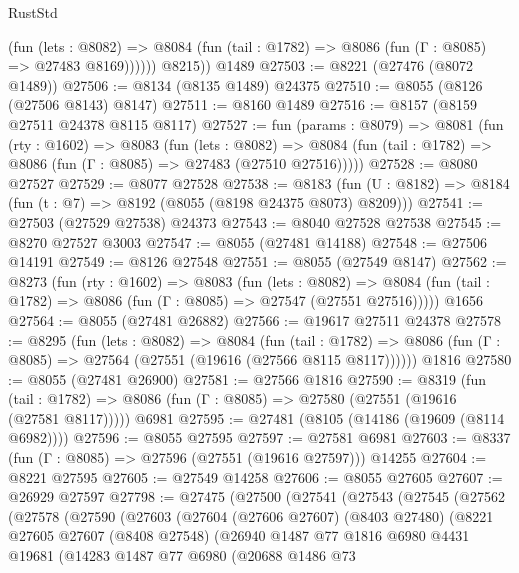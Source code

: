 \begin{lexlean}{RustStd}
\begin{coremodule}
              (fun (lets : @8082) =>
              @8084 (fun (tail : @1782) => @8086 (fun (Γ : @8085) => @27483 @8169))))))
        @8215))
    @1489
@27503 := @8221 (@27476 (@8072 @1489))
@27506 := @8134 (@8135 @1489) @24375
@27510 := @8055 (@8126 (@27506 @8143) @8147)
@27511 := @8160 @1489
@27516 := @8157 (@8159 @27511 @24378 @8115 @8117)
@27527 := fun (params : @8079) =>
  @8081
    (fun (rty : @1602) =>
    @8083
      (fun (lets : @8082) =>
      @8084 (fun (tail : @1782) => @8086 (fun (Γ : @8085) => @27483 (@27510 @27516)))))
@27528 := @8080 @27527
@27529 := @8077 @27528
@27538 := @8183
    (fun (U : @8182) => @8184 (fun (t : @7) => @8192 (@8055 (@8198 @24375 @8073) @8209)))
@27541 := @27503 (@27529 @27538) @24373
@27543 := @8040 @27528 @27538
@27545 := @8270 @27527 @3003
@27547 := @8055 (@27481 @14188)
@27548 := @27506 @14191
@27549 := @8126 @27548
@27551 := @8055 (@27549 @8147)
@27562 := @8273
    (fun (rty : @1602) =>
    @8083
      (fun (lets : @8082) =>
      @8084 (fun (tail : @1782) => @8086 (fun (Γ : @8085) => @27547 (@27551 @27516)))))
    @1656
@27564 := @8055 (@27481 @26882)
@27566 := @19617 @27511 @24378
@27578 := @8295
    (fun (lets : @8082) =>
    @8084
      (fun (tail : @1782) =>
      @8086 (fun (Γ : @8085) => @27564 (@27551 (@19616 (@27566 @8115 @8117))))))
    @1816
@27580 := @8055 (@27481 @26900)
@27581 := @27566 @1816
@27590 := @8319
    (fun (tail : @1782) => @8086 (fun (Γ : @8085) => @27580 (@27551 (@19616 (@27581 @8117)))))
    @6981
@27595 := @27481 (@8105 (@14186 (@19609 (@8114 @6982))))
@27596 := @8055 @27595
@27597 := @27581 @6981
@27603 := @8337 (fun (Γ : @8085) => @27596 (@27551 (@19616 @27597))) @14255
@27604 := @8221 @27595
@27605 := @27549 @14258
@27606 := @8055 @27605
@27607 := @26929 @27597
@27798 := @27475
    (@27500
      (@27541
        (@27543
          (@27545
            (@27562
              (@27578
                (@27590
                  (@27603
                    (@27604
                      (@27606 @27607)
                      (@8403 @27480)
                      (@8221
                        @27605
                        @27607
                        (@8408 @27548)
                        (@26940
                          @1487
                          @77
                          @1816
                          @6980
                          @4431
                          @19681
                          (@14283
                            @1487
                            @77
                            @6980
                            (@20688
                              @1486
                              @73

\end{coremodule}
\end{lexlean}
